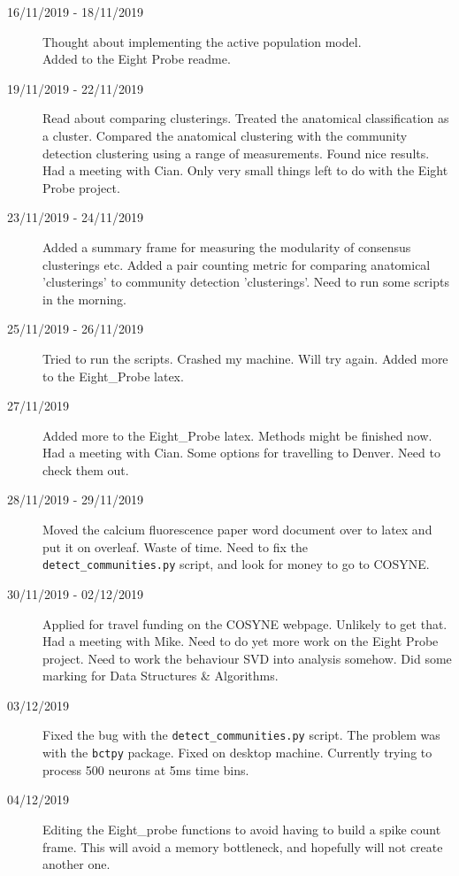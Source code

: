 \documentclass[a4paper,12pt]{article}
\theoremstyle{definition}
\begin{document}
\begin{description}
	\item[16/11/2019 - 18/11/2019] Thought about implementing the active population model. \\ Added to the Eight Probe readme.

	\item[19/11/2019 - 22/11/2019] Read about comparing clusterings. Treated the anatomical classification as a cluster. Compared the anatomical clustering with the community detection clustering using a range of measurements. Found nice results. Had a meeting with Cian. Only very small things left to do with the Eight Probe project.

	\item[23/11/2019 - 24/11/2019] Added a summary frame for measuring the modularity of consensus clusterings etc. Added a pair counting metric for comparing anatomical 'clusterings' to community detection 'clusterings'. Need to run some scripts in the morning.

	\item[25/11/2019 - 26/11/2019] Tried to run the scripts. Crashed my machine. Will try again. Added more to the Eight\_Probe latex.

	\item[27/11/2019] Added more to the Eight\_Probe latex. Methods might be finished now. Had a meeting with Cian. Some options for travelling to Denver. Need to check them out.

	\item[28/11/2019 - 29/11/2019] Moved the calcium fluorescence paper word document over to latex and put it on overleaf. Waste of time. Need to fix the \\ \texttt{detect\_communities.py} script, and look for money to go to COSYNE.

	\item[30/11/2019 - 02/12/2019] Applied for travel funding on the COSYNE webpage. Unlikely to get that. Had a meeting with Mike. Need to do yet more work on the Eight Probe project. Need to work the behaviour SVD into analysis somehow. Did some marking for Data Structures \& Algorithms.

	\item[03/12/2019] Fixed the bug with the \texttt{detect\_communities.py} script. The problem was with the \texttt{bctpy} package. Fixed on desktop machine. Currently trying to process 500 neurons at 5ms time bins.

	\item[04/12/2019] Editing the Eight\_probe functions to avoid having to build a spike count frame. This will avoid a memory bottleneck, and hopefully will not create another one.


\end{description}
\end{document}

